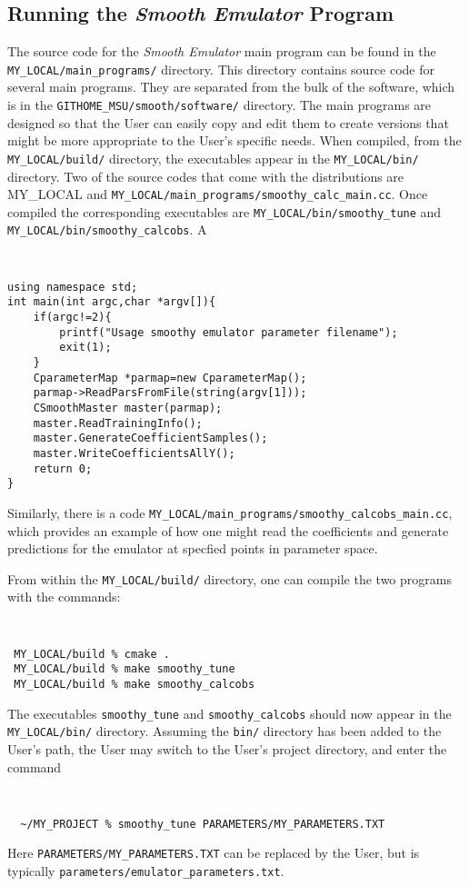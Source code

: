 \documentclass[UserManual.tex]{subfiles}
\begin{document}
\subsection{Running the {\it Smooth Emulator} Program}

The source code for the {\it Smooth Emulator} main program can be found in the {\tt MY\_LOCAL/main\_programs/} directory. This directory contains source code for several main programs. They are separated from the bulk of the software, which is in the {\tt GITHOME\_MSU/smooth/software/} directory. The main programs are designed so that the User can easily copy and edit them to create versions that might be more appropriate to the User's specific needs. When compiled, from the {\tt MY\_LOCAL/build/} directory, the executables appear in the {\tt MY\_LOCAL/bin/} directory. Two of the source codes that come with the distributions are MY\_LOCAL and {\tt MY\_LOCAL/main\_programs/smoothy\_calc\_main.cc}. Once compiled the corresponding executables are {\tt MY\_LOCAL/bin/smoothy\_tune} and {\tt MY\_LOCAL/bin/smoothy\_calcobs}. A 
{\tt
\begin{verbatim}
using namespace std;
int main(int argc,char *argv[]){
    if(argc!=2){
        printf("Usage smoothy emulator parameter filename");
        exit(1);
    }
    CparameterMap *parmap=new CparameterMap();
    parmap->ReadParsFromFile(string(argv[1]));
    CSmoothMaster master(parmap);
    master.ReadTrainingInfo();
    master.GenerateCoefficientSamples();
    master.WriteCoefficientsAllY();
    return 0;
}
\end{verbatim}
}
Similarly, there is a code {\tt MY\_LOCAL/main\_programs/smoothy\_calcobs\_main.cc}, which provides an example of how one might read the coefficients and generate predictions for the emulator at specfied points in parameter space.

From within the {\tt MY\_LOCAL/build/} directory, one can compile the two programs with the commands:
{\tt
\begin{verbatim}
 MY_LOCAL/build % cmake .
 MY_LOCAL/build % make smoothy_tune
 MY_LOCAL/build % make smoothy_calcobs
\end{verbatim}
}
The executables {\tt smoothy\_tune} and {\tt smoothy\_calcobs} should now appear in the {\tt MY\_LOCAL/bin/} directory. Assuming the {\tt bin/} directory has been added to the User's path, the User may switch to the User's project directory, and enter the command
{\tt
\begin{verbatim}
  ~/MY_PROJECT % smoothy_tune PARAMETERS/MY_PARAMETERS.TXT
\end{verbatim}
}
Here {\tt PARAMETERS/MY\_PARAMETERS.TXT} can be replaced by the User, but is typically {\tt parameters/emulator\_parameters.txt}.
\end{document}

